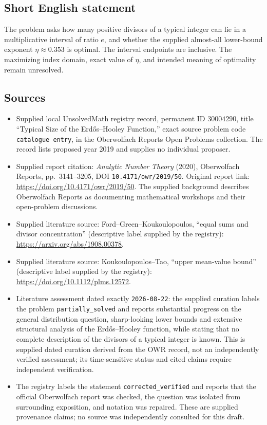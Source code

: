 \documentclass[11pt]{article}
\begin{document}
\subsection{Short English statement}
The problem asks how many positive divisors of a typical integer can lie in a multiplicative interval of ratio \(e\), and whether the supplied almost-all lower-bound exponent \(\eta\approx0.353\) is optimal. The interval endpoints are inclusive. The maximizing index domain, exact value of \(\eta\), and intended meaning of optimality remain unresolved.
\subsection{Sources}
\begin{itemize}
\item Supplied local UnsolvedMath registry record, permanent ID \(30004290\), title ``Typical Size of the Erdős--Hooley Function,'' exact source problem code \texttt{catalogue entry}, in the Oberwolfach Reports Open Problems collection. The record lists proposed year 2019 and supplies no individual proposer.
\item Supplied report citation: \emph{Analytic Number Theory} (2020), Oberwolfach Reports, pp.~3141--3205, DOI \texttt{10.4171/owr/2019/50}. Original report link: \url{https://doi.org/10.4171/owr/2019/50}. The supplied background describes Oberwolfach Reports as documenting mathematical workshops and their open-problem discussions.
\item Supplied literature source: Ford--Green--Koukoulopoulos, ``equal sums and divisor concentration'' (descriptive label supplied by the registry): \url{https://arxiv.org/abs/1908.00378}.
\item Supplied literature source: Koukoulopoulos--Tao, ``upper mean-value bound'' (descriptive label supplied by the registry): \url{https://doi.org/10.1112/plms.12572}.
\item Literature assessment dated exactly \texttt{2026-08-22}: the supplied curation labels the problem \texttt{partially\_solved} and reports substantial progress on the general distribution question, sharp-looking lower bounds and extensive structural analysis of the Erdős--Hooley function, while stating that no complete description of the divisors of a typical integer is known. This is supplied dated curation derived from the OWR record, not an independently verified assessment; its time-sensitive status and cited claims require independent verification.
\item The registry labels the statement \texttt{corrected\_verified} and reports that the official Oberwolfach report was checked, the question was isolated from surrounding exposition, and notation was repaired. These are supplied provenance claims; no source was independently consulted for this draft.
\end{itemize}
\end{document}
